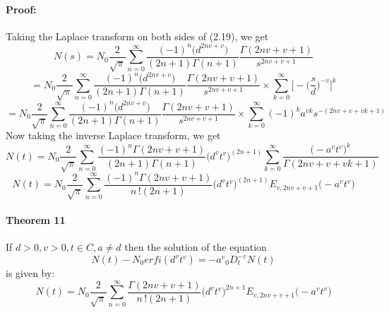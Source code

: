 \documentclass{article}
\begin{document}
\paragraph{Proof:}
Taking the Laplace transform on both sides of (2.19), we get
\begin{equation*}
    N(s)=N_0
    {\frac{2}{\sqrt{\pi}}}
    \sum_{n = 0}^{\infty}
    \frac{(-1)^n{\big(d^{2nv+v}\big)}}{(2n+1)\Gamma{(n+1)}}
    \frac{\Gamma{(2nv+v+1)}}{s^{2nv+v+1}}
\end{equation*}
\begin{equation*}
    =N_0
    {\frac{2}{\sqrt{\pi}}}
    \sum_{n = 0}^{\infty}
    \frac{(-1)^n{\big(d^{2nv+v}\big)}}{(2n+1)\Gamma{(n+1)}}
    \frac{\Gamma{(2nv+v+1)}}{s^{2nv+v+1}}
    \times
    \sum_{k=0}^{\infty}
    \bigg[
        -{\bigg(\frac{s}{d}\bigg)^{-v}}
    \bigg]^k
\end{equation*}
\begin{equation*}
    =N_0
    {\frac{2}{\sqrt{\pi}}}
    \sum_{n = 0}^{\infty}
    \frac{(-1)^n{\big(d^{2nv+v}\big)}}{(2n+1)\Gamma{(n+1)}}
    \frac{\Gamma{(2nv+v+1)}}{s^{2nv+v+1}}
    \times
    \sum_{k=0}^{\infty}
    (-1)^k{a^{vk}}{s^{-(2nv+v+vk+1)}}
\end{equation*}
Now taking the inverse Laplace transform, we get
\begin{equation*}
    N(t) = N_0
    {\frac{2}{\sqrt{\pi}}}
    \sum_{n = 0}^{\infty}
    \frac{(-1)^n\Gamma{(2nv+v+1)}}{(2n+1)\Gamma{(n+1)}}
    \big({d^v}{t^v} \big) ^{(2n+1)}
    \sum_{k=0}^{\infty}
    \frac{\big(-{a^v}{t^v}\big)^k}{\Gamma{(2nv+v+vk+1)}}
\end{equation*}
\begin{equation*}
    N(t) = N_0
    {\frac{2}{\sqrt{\pi}}}
    \sum_{n = 0}^{\infty}
    \frac{(-1)^n\Gamma{(2nv+v+1)}}{{n\,!}(2n+1)}
    \big({d^v}{t^v}\big)^{(2n+1)}
    E_{v, 2nv+v+1}
    \big(-{a^v}{t^v}\big)
\end{equation*}
\paragraph{Theorem 11}
If $d > 0, v > 0, t \in C, a \neq d $ then the solution of the equation
\begin{equation}
    N(t) - {N_0}erfi({d^v}{t^v}) = {-a^v}{_0D_t^{-v}}N(t)
\end{equation}
is given by:
\begin{equation}
    N(t) = N_0
    {\frac{2}{\sqrt{\pi}}}
    \sum_{n = 0}^{\infty}
    \frac{\Gamma{(2nv+v+1)}}{{n\,!}(2n+1)}
    \big({d^v}{t^v}\big)^{2n+1}
    E_{v, 2nv+v+1}
    \big(-{a^v}{t^v} \big)
\end{equation}
\end{document}
